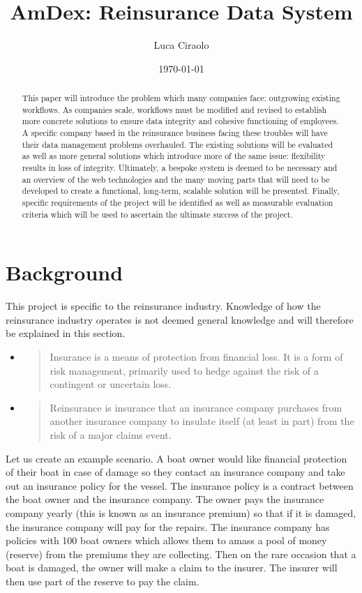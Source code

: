 \documentclass[12pt]{article}
\title{AmDex: Reinsurance Data System}
\author{Luca Ciraolo}
\date{\today}
\begin{document}
\maketitle
\begin{abstract}
    This paper will introduce the problem which many companies face: outgrowing existing workflows. As companies scale, workflows must be modified and revised to establish more concrete solutions to ensure data integrity and cohesive functioning of employees. A specific company based in the reinsurance business facing these troubles will have their data management problems overhauled. The existing solutions will be evaluated as well as more general solutions which introduce more of the same issue: flexibility results in loss of integrity. Ultimately, a bespoke system is deemed to be necessary and an overview of the web technologies and the many moving parts that will need to be developed to create a functional, long-term, scalable solution will be presented. Finally, specific requirements of the project will be identified as well as measurable evaluation criteria which will be used to ascertain the ultimate success of the project.
\end{abstract}

\section{Background}
This project is specific to the reinsurance industry. Knowledge of how the reinsurance industry operates is not deemed general knowledge and will therefore be explained in this section.

\begin{itemize}
    \item \blockquote[\cite{wikipedia_insurance}]{Insurance is a means of protection from financial loss. It is a form of risk management, primarily used to hedge against the risk of a contingent or uncertain loss.}
    \item \blockquote[\cite{wikipedia_reinsurance}]{Reinsurance is insurance that an insurance company purchases from another insurance company to insulate itself (at least in part) from the risk of a major claims event.}
\end{itemize}

Let us create an example scenario. A boat owner would like financial protection of their boat in case of damage so they contact an insurance company and take out an insurance policy for the vessel. The insurance policy is a contract between the boat owner and the insurance company. The owner pays the insurance company yearly (this is known as an insurance premium) so that if it is damaged, the insurance company will pay for the repairs. The insurance company has policies with 100 boat owners which allows them to amass a pool of money (reserve) from the premiums they are collecting. Then on the rare occasion that a boat is damaged, the owner will make a claim to the insurer. The insurer will then use part of the reserve to pay the claim.
\end{document}
